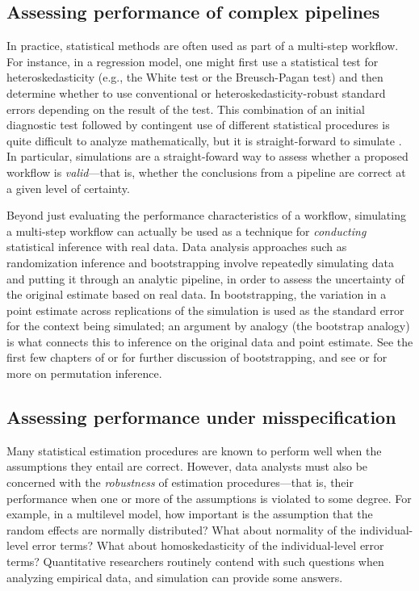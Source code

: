 \documentclass[
]{book}
\begin{document}
\subsection{Assessing performance of complex pipelines}\label{assessing-performance-of-complex-pipelines}

In practice, statistical methods are often used as part of a multi-step workflow.
For instance, in a regression model, one might first use a statistical test for heteroskedasticity (e.g., the White test or the Breusch-Pagan test) and then determine whether to use conventional or heteroskedasticity-robust standard errors depending on the result of the test.
This combination of an initial diagnostic test followed by contingent use of different statistical procedures is quite difficult to analyze mathematically, but it is straight-forward to simulate \citep[see, for example,][]{longUsingHeteroscedasticityConsistent2000}.
In particular, simulations are a straight-foward way to assess whether a proposed workflow is \emph{valid}---that is, whether the conclusions from a pipeline are correct at a given level of certainty.

Beyond just evaluating the performance characteristics of a workflow, simulating a multi-step workflow can actually be used as a technique for \emph{conducting} statistical inference with real data.
Data analysis approaches such as randomization inference and bootstrapping involve repeatedly simulating data and putting it through an analytic pipeline, in order to assess the uncertainty of the original estimate based on real data.
In bootstrapping, the variation in a point estimate across replications of the simulation is used as the standard error for the context being simulated;
an argument by analogy (the bootstrap analogy) is what connects this to inference on the original data and point estimate.
See the first few chapters of \citet{davison1997BootstrapMethodsTheir} or \citet{efron2000BootstrapModernStatistics} for further discussion of bootstrapping, and see \citet{good2013permutation} or \citet{lehmann1975statistical} for more on permutation inference.

\subsection{Assessing performance under misspecification}\label{assessing-performance-under-misspecification}

Many statistical estimation procedures are known to perform well when the assumptions they entail are correct.
However, data analysts must also be concerned with the \emph{robustness} of estimation procedures---that is, their performance when one or more of the assumptions is violated to some degree.
For example, in a multilevel model, how important is the assumption that the random effects are normally distributed? What about normality of the individual-level error terms? What about homoskedasticity of the individual-level error terms?
Quantitative researchers routinely contend with such questions when analyzing empirical data, and simulation can provide some answers.
\end{document}
